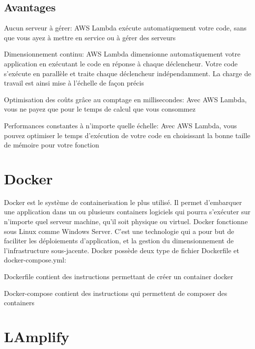 \subsection{Avantages}
\begin{list}{•}
	\item Aucun serveur à gérer:
	AWS Lambda exécute automatiquement votre code, sans que vous ayez à mettre en service ou à gérer des
	serveurs
	\item Dimensionnement continu:
	AWS Lambda dimensionne automatiquement votre application en exécutant le code en réponse à chaque
	déclencheur. Votre code s’exécute en parallèle et traite chaque déclencheur indépendamment. La charge de
	travail est ainsi mise à l’échelle de façon précis
	\item Optimisation des coûts grâce au comptage en millisecondes:
	Avec AWS Lambda, vous ne payez que pour le temps de calcul que vous consommez
	\item Performances constantes à n’importe quelle échelle:
	Avec AWS Lambda, vous pouvez optimiser le temps d’exécution de votre code en choisissant la bonne taille de mémoire pour
	votre fonction
\end{list}


\section{Docker}
Docker est le système de containerisation le plus utilisé. Il permet d’embarquer une application dans un ou plusieurs containers
logiciels qui pourra s’exécuter sur n’importe quel serveur machine, qu’il soit physique ou virtuel. Docker fonctionne sous Linux
comme Windows Server. C’est une technologie qui a pour but de faciliter les déploiements d’application, et la gestion du
dimensionnement de l’infrastructure sous-jacente.
Docker possède deux type de fichier Dockerfile et docker-compose.yml:
\begin{list}{•}
	\item Dockerfile contient des instructions permettant de créer un container docker
	\item Docker-compose contient des instructions qui permettent de composer des containers
\end{list}



\section{LAmplify}

